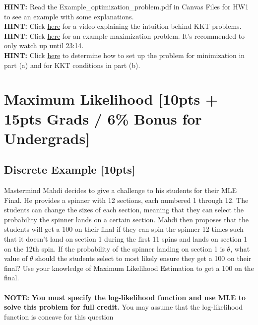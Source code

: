 \documentclass{article}
\begin{document}
\noindent\textbf{HINT:} Read the Example\_optimization\_problem.pdf in Canvas Files for HW1 to see an example with some explanations. \\
\noindent\textbf{HINT:} Click \href{https://www.youtube.com/watch?v=TqN-8fxYUYY}{here} for a video explaining the intuition behind KKT problems.\\
\noindent\textbf{HINT:} Click \href{https://www.youtube.com/watch?v=TqN-8fxYUYY}{here} for an example maximization problem. It's recommended to only watch up until 23:14. \\
\noindent\textbf{HINT:} Click \href{https://en.wikipedia.org/wiki/Karush-Kuhn-Tucker_conditions#Nonlinear_optimization_problem}{here} to determine how to set up the problem for minimization in part (a) and for KKT conditions in part (b).\\



\newpage

\section{Maximum Likelihood [10pts + 15pts Grads / 6\% Bonus for Undergrads]}
\subsection{Discrete Example [10pts]}
Mastermind Mahdi decides to give a challenge to his students for their MLE Final. He provides a spinner with 12 sections, each numbered 1 through 12. The students can change the sizes of each section, meaning that they can select the probability the spinner lands on a certain section. Mahdi then proposes that the students will get a 100 on their final if they can spin the spinner 12 times such that it doesn't land on section 1 during the first 11 spins and lands on section 1 on the 12th spin. If the probability of the spinner landing on section 1 is $\theta$, what value of $\theta$ should the students select to most likely ensure they get a 100 on their final? Use your knowledge of Maximum Likelihood Estimation to get a 100 on the final. \\\\\textbf{NOTE: } \textbf{You must specify the log-likelihood function and use MLE to solve this problem for full credit.} You may assume that the log-likelihood function is concave for this question \\\\
\end{document}
